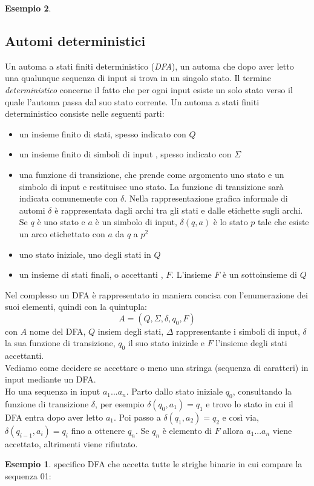 \documentclass[a4paper]{book}
\theoremstyle{definition}%
\newtheorem*{esempio}{Esempio}
\begin{document}
\begin{esempio}
{\subsection{Automi deterministici}
Un automa a stati finiti deterministico (\textit{DFA}), un automa che dopo aver letto una qualunque sequenza di input si trova in un singolo stato. Il termine \textit{deterministico} concerne il fatto che per ogni input esiste un solo stato verso il quale l'automa passa dal suo stato corrente. Un automa a stati finiti deterministico consiste nelle seguenti parti:
\begin{itemize}
\item un insieme finito di stati, spesso indicato con $Q$
\item un insieme finito di simboli di input , spesso indicato con $\Sigma$
\item una funzione di transizione, che prende come argomento uno stato e un simbolo di input e restituisce uno stato. La funzione di transizione sarà indicata comunemente con $\delta$. Nella rappresentazione grafica informale di automi $\delta$ è rappresentata dagli archi tra gli stati e dalle etichette sugli archi. Se $q$ è uno stato e $a$ è un simbolo di input, $\delta(q,a)$ è lo stato $p$ tale che esiste un arco etichettato con $a$ da $q$ a $p^2$
\item uno stato iniziale, uno degli stati in $Q$
\item un insieme di stati finali, o accettanti , $F$. L'insieme $F$ è un sottoinsieme di $Q$
\end{itemize}
Nel complesso un DFA è rappresentato in maniera concisa con l'enumerazione dei suoi elementi, quindi con la quintupla:
$$A=(Q,\Sigma,\delta,q_0,F)$$
con $A$ nome del DFA, $Q$ insiem degli stati, $\Delta$ rappresentante i simboli di input, $\delta$ la sua funzione di transizione, $q_0$ il suo stato iniziale e $F$ l'insieme degli stati accettanti.\\
Vediamo come decidere se accettare o meno una stringa (sequenza di caratteri) in input mediante un DFA.\\
Ho una sequenza in input $a_1...a_n$. Parto dallo stato iniziale $q_0$, consultando la funzione di transizione $\delta$, per esempio  $\delta(q_0,a_1)=q_1$ e trovo lo stato in cui il DFA entra dopo aver letto $a_1$. Poi passo a $\delta(q_1,a_2)=q_2$ e così via, $\delta(q_{i-1},a_i)=q_i$ fino a ottenere $q_n$. Se $q_n$ è elemento di $F$ allora $a_1...a_n$ viene accettato, altrimenti viene rifiutato.
\begin{esempio}
specifico DFA che accetta tutte le strighe binarie in cui compare la sequenza 01:

\end{esempio}}
\end{esempio}
\end{document}
